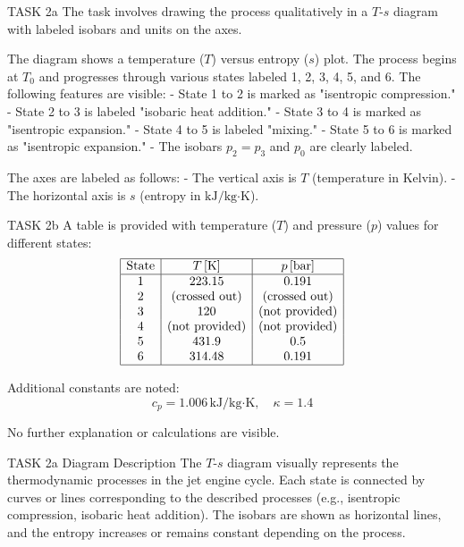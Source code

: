 TASK 2a  
The task involves drawing the process qualitatively in a \( T \)-\( s \) diagram with labeled isobars and units on the axes.  

The diagram shows a temperature (\( T \)) versus entropy (\( s \)) plot. The process begins at \( T_0 \) and progresses through various states labeled 1, 2, 3, 4, 5, and 6. The following features are visible:  
- State 1 to 2 is marked as "isentropic compression."  
- State 2 to 3 is labeled "isobaric heat addition."  
- State 3 to 4 is marked as "isentropic expansion."  
- State 4 to 5 is labeled "mixing."  
- State 5 to 6 is marked as "isentropic expansion."  
- The isobars \( p_2 = p_3 \) and \( p_0 \) are clearly labeled.  

The axes are labeled as follows:  
- The vertical axis is \( T \) (temperature in Kelvin).  
- The horizontal axis is \( s \) (entropy in \( \text{kJ}/\text{kg·K} \)).  

TASK 2b  
A table is provided with temperature (\( T \)) and pressure (\( p \)) values for different states:  
\[
\begin{array}{|c|c|c|}
\hline
\text{State} & T \, [\text{K}] & p \, [\text{bar}] \\
\hline
1 & 223.15 & 0.191 \\
2 & \text{(crossed out)} & \text{(crossed out)} \\
3 & 120 & \text{(not provided)} \\
4 & \text{(not provided)} & \text{(not provided)} \\
5 & 431.9 & 0.5 \\
6 & 314.48 & 0.191 \\
\hline
\end{array}
\]

Additional constants are noted:  
\[
c_p = 1.006 \, \text{kJ}/\text{kg·K}, \quad \kappa = 1.4
\]  

No further explanation or calculations are visible.  

TASK 2a Diagram Description  
The \( T \)-\( s \) diagram visually represents the thermodynamic processes in the jet engine cycle. Each state is connected by curves or lines corresponding to the described processes (e.g., isentropic compression, isobaric heat addition). The isobars are shown as horizontal lines, and the entropy increases or remains constant depending on the process.